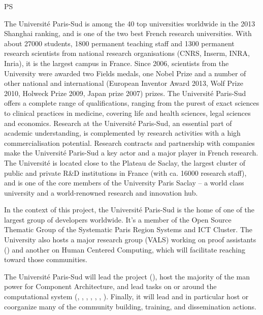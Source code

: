 \begin{sitedescription}{PS}

The Université Paris-Sud is among the 40 top universities worldwide in the
2013 Shanghai ranking, and is one of the two best French research
universities. With about 27000 students, 1800 permanent teaching staff
and 1300 permanent research scientists from national research
organisations (CNRS, Inserm, INRA, Inria), it is the largest campus in
France. Since 2006, scientists from the University were awarded two
Fields medals, one Nobel Prize and a number of other national and international
(European Inventor Award 2013, Wolf Prize 2010, Holweck Prize 2009,
Japan prize 2007) prizes.  The Université Paris-Sud offers a
complete range of qualifications, ranging from the purest of exact
sciences to clinical practices in medicine, covering life and health
sciences, legal sciences and economics. Research at the Université
Paris-Sud, an essential part of academic understanding, is
complemented by research activities with a high commercialisation
potential. Research contracts and partnership with companies make the
Université Paris-Sud a key actor and a major player in French
research.  The Université is located close to the Plateau de Saclay,
the largest cluster of public and private R\&D institutions in France
(with ca. 16000 research staff), and is one of the core members of the
University Paris Saclay – a world class university and a
world-renowned research and innovation hub.

In the context of this project, the Université Paris-Sud is the
home of one of the largest group of \Sage developers worldwide.
It's a member of the Open Source Thematic Group of the Systematic
Paris Region Systems and ICT Cluster. The University also hosts a
major research group (VALS) working on proof assistants () and
another on Human Centered Computing, which will facilitate reaching
toward those communities.

The Université Paris-Sud will lead the project (),
host the majority of the man power for 
Component Architecture, and lead tasks on or around the \Sage
computational system (,
,
, ,
, ,
). Finally, it will lead  and in
particular host or coorganize many of the community building,
training, and dissemination actions.


\end{sitedescription}
